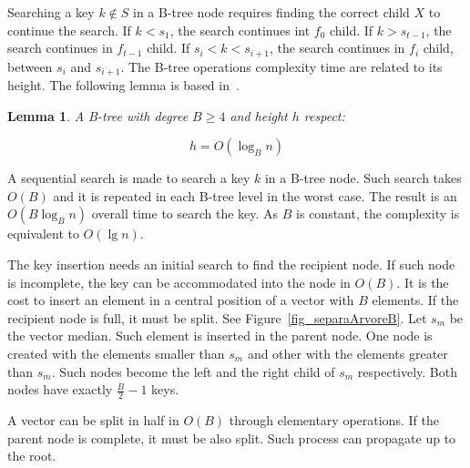 \documentclass[11pt]{article}
\newtheorem{lema}{Lemma}
\begin{document}
Searching a key $k \notin S$ in a B-tree node requires finding the correct child $X$ to continue the search. If $k < s_1$, the search continues int $f_0$ child. If $k > s_{t-1}$, the search continues in $f_{t-1}$ child. If $s_i < k < s_{i+1}$, the search continues in $f_i$ child, between $s_i$ and $s_{i+1}$. The B-tree operations complexity time are related to its height. The following lemma is based in~\cite{cormen}.







\begin{lema}
A B-tree with degree $B \geq 4$  and height $h$ respect:


\[ h =O (\log_B n) \]

\end{lema}




A sequential search is made to search a key $k$ in a B-tree node. Such search takes $O(B)$ and it is repeated in each B-tree level in the worst case. The result is an $O(B \log_B {n})$ overall time to search the key. As $B$ is constant, the complexity is equivalent to $O (\lg n)$.





The key insertion needs an initial search to find the recipient node. If such node is incomplete, the key can be accommodated into the node in $O(B)$. It is the cost to insert an element in a central position of a vector with $B$ elements. If the recipient node is full, it must be split. See Figure~\ref{fig_separaArvoreB}.  Let $s_m$ be the vector median. Such element is inserted in the parent node. One node is created with the elements smaller than $s_m$ and other with the elements greater than $s_m$. Such nodes become the left and the right child of $s_m$ respectively. Both nodes have exactly $\frac{B}{2}-1$ keys.



A vector can be split in half in $O(B)$ through elementary operations. If the parent node is complete, it must be also split. Such process can propagate up to the root.
\end{document}
